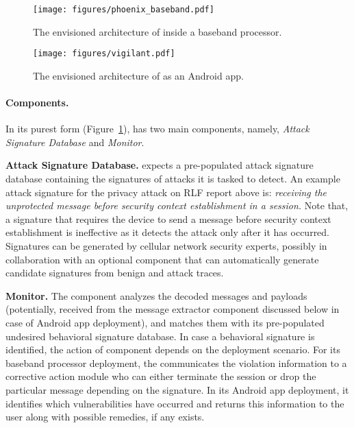 \begin{figure}[t]
	\centering
		\texttt{[image: figures/phoenix\_baseband.pdf]}
		\caption{The envisioned architecture of \system inside a baseband processor.}
		\label{fig:baseband_implementation}
	\end{figure}


\begin{figure}[t]
\centering
	\texttt{[image: figures/vigilant.pdf]}
	\caption{The envisioned architecture of \system as an Android app.}
	\label{fig:overview}
\end{figure}



\paragraph{\systemtitle Components.}
In its purest form (Figure~\ref{fig:baseband_implementation}), \system has two main components, namely,
\textit{Attack Signature Database} and  \textit{Monitor}.


\textbf{Attack Signature Database.} \system expects a pre-populated attack signature database containing
the signatures of attacks it is tasked to detect. An example attack signature for the privacy attack on
RLF report above is: \emph{receiving the unprotected  \ueInformationRequest message
before security context establishment in a session.} Note that, a signature that requires the device to send a \rlfReport
message before security context establishment is ineffective as it detects the attack only after it has occurred. Signatures
can be generated by cellular network security experts, possibly in collaboration with an optional \system component that
can automatically generate candidate signatures from benign and attack traces.

\textbf{Monitor.} The \monitor  component analyzes the decoded messages and payloads (potentially,
received from the message extractor component discussed below in case of Android app deployment),
and matches them with its pre-populated undesired behavioral signature database.
In case a behavioral signature is identified, the action of \monitor component depends on the deployment scenario.
For its baseband processor deployment, the \monitor communicates the violation information to a corrective action
module who can either terminate the session or drop the particular message depending on the signature. In its
Android app deployment, it identifies which vulnerabilities have occurred and returns this information to the user along
with possible remedies, if any exists.


